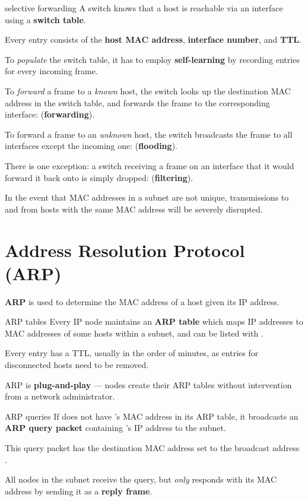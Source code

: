 \begin{defn}{selective forwarding}
    A switch knows that a host is reachable via an interface using a \textbf{switch table}.

    Every entry consists of the \textbf{host MAC address}, \textbf{interface number}, and \textbf{TTL}.

    To \textit{populate} the switch table, it has to employ \textbf{self-learning} by recording entries for every incoming frame.

    To \textit{forward} a frame to a \textit{known} host, the switch looks up the destination MAC address in the switch table,
    and forwards the frame to the corresponding interface: (\textbf{forwarding}).

    To forward a frame to an \textit{unknown} host, the switch broadcasts the frame to all interfaces except the incoming one: (\textbf{flooding}).

    There is one exception: a switch receiving a frame on an interface that it would forward it back onto is simply dropped: (\textbf{filtering}).
\end{defn}

In the event that MAC addresses in a subnet are not unique, transmissions to and from hosts with the same MAC address will be severely disrupted.


\section{Address Resolution Protocol (ARP)}

\textbf{ARP} is used to determine the MAC address of a host given its IP address.

\begin{defn}{ARP tables}
    Every IP node maintains an \textbf{ARP table} which maps IP addresses to MAC addresses
    of some hosts within a subnet, and can be listed with .

    Every entry has a TTL, usually in the order of minutes, as entries for disconnected hosts need to be removed.
\end{defn}

ARP is \textbf{plug-and-play} --- nodes create their ARP tables without intervention from
a network administrator.

\begin{defn}{ARP queries}
    If  does not have 's MAC address in its ARP table, it broadcasts an \textbf{ARP query
    packet} containing 's IP address to the subnet.

    This query packet has the destination MAC address set to the broadcast address .

    All nodes in the subnet receive the query, but \textit{only}  responds with its MAC address
    by sending it as a \textbf{reply frame}.
\end{defn}

